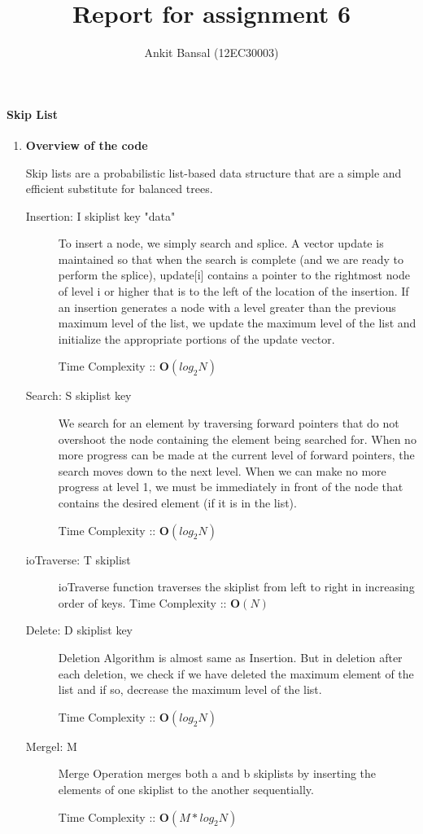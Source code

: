 \documentclass[a4paper,11pt]{article}
\title{Report for assignment 6}
\author{Ankit Bansal (12EC30003)}
\begin{document}
\maketitle

\paragraph{Skip List}
\begin{enumerate}
 \item \textbf{Overview of the code}

Skip lists  are a probabilistic list-based data structure that are a simple and efficient substitute for balanced trees.
\begin{description}
  \item[Insertion: I skiplist key "data"]
To insert  a node, we simply search and splice. A vector update is maintained so that when the search is complete (and we are ready to perform the splice), update[i] contains a pointer to the rightmost node of level i or higher that is to the left of the location of the
insertion. If an insertion generates a node with a level greater than the previous maximum level of the list, we update the maximum level of the list and initialize the appropriate portions of the update vector.

Time Complexity :: \textbf{O$\left( log_2N \right)$}
  \item[Search: S skiplist key]
We search for an element by traversing forward pointers that do not overshoot the node containing the element being searched for. When no more progress can be made at the current level of forward pointers, the search moves down to the next level. When we can make no more progress at level 1, we must be immediately in front of the node that contains the desired element (if it is in the list).
  
 Time Complexity :: \textbf{O$\left( log_2N \right)$}
  \item[ioTraverse: T skiplist]
ioTraverse function traverses the skiplist from left to right in increasing order of keys.
Time Complexity :: \textbf{O$\left( N \right)$}
  \item[Delete: D skiplist key]
Deletion Algorithm is almost same as Insertion. But in deletion after each deletion, we check if we have deleted the
maximum element of the list and if so, decrease the maximum level of the list.

Time Complexity :: \textbf{O$\left( log_2N \right)$}
  \item[Mergel: M ]
Merge Operation merges both a and b skiplists by inserting the elements of one skiplist to the another sequentially.

Time Complexity :: \textbf{O$\left(M* log_2N \right)$}
 
\end{description}
\end{enumerate}
\end{document}
